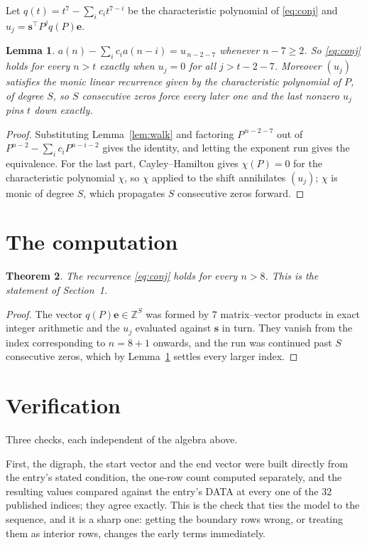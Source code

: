 \documentclass[11pt,a4paper]{article}
\theoremstyle{plain}
\newtheorem{theorem}{Theorem}
\newtheorem{lemma}[theorem]{Lemma}
\theoremstyle{definition}
\begin{document}
Let $q(t)=t^{7}-\sum_i c_i t^{7-i}$ be the characteristic polynomial of
\eqref{eq:conj} and $u_j=\mathbf{s}^{\!\top}P^{j}q(P)\mathbf{e}$.

\begin{lemma}\label{lem:crit}
$a(n)-\sum_i c_i a(n-i)=u_{\,n-2-7}$ whenever $n-7\ge2$. So \eqref{eq:conj}
holds for every $n>t$ exactly when $u_j=0$ for all $j>t-2-7$. Moreover $(u_j)$
satisfies the monic linear recurrence given by the characteristic polynomial of $P$, of
degree $S$, so $S$ consecutive zeros force every later one and the last nonzero $u_j$ pins
$t$ down exactly.
\end{lemma}

\begin{proof}
Substituting Lemma~\ref{lem:walk} and factoring $P^{\,n-2-7}$ out of
$P^{n-2}-\sum_i c_i P^{n-i-2}$ gives the identity, and letting the exponent run gives the
equivalence. For the last part, Cayley--Hamilton gives $\chi(P)=0$ for the characteristic
polynomial $\chi$, so $\chi$ applied to the shift annihilates $(u_j)$; $\chi$ is monic of
degree $S$, which propagates $S$ consecutive zeros forward.
\end{proof}

\section{The computation}

\begin{theorem}
The recurrence \eqref{eq:conj} holds for every $n>8$. This is the statement of
Section~1.
\end{theorem}

\begin{proof}
The vector $q(P)\mathbf{e}\in\mathbb{Z}^{S}$ was formed by $7$ matrix--vector
products in exact integer arithmetic and the $u_j$ evaluated against $\mathbf{s}$ in turn.
They vanish from the index corresponding to $n=8+1$ onwards, and the run was continued
past $S$ consecutive zeros, which by Lemma~\ref{lem:crit} settles every larger index.
\end{proof}

\section{Verification}

Three checks, each independent of the algebra above.

First, the digraph, the start vector and the end vector were built directly from the
entry's stated condition, the one-row count computed separately, and the resulting values
compared against the entry's DATA at every one of the $32$ published indices; they
agree exactly. This is the check that ties the model to the sequence, and it is a sharp one:
getting the boundary rows wrong, or treating them as interior rows, changes the early terms
immediately.
\end{document}
